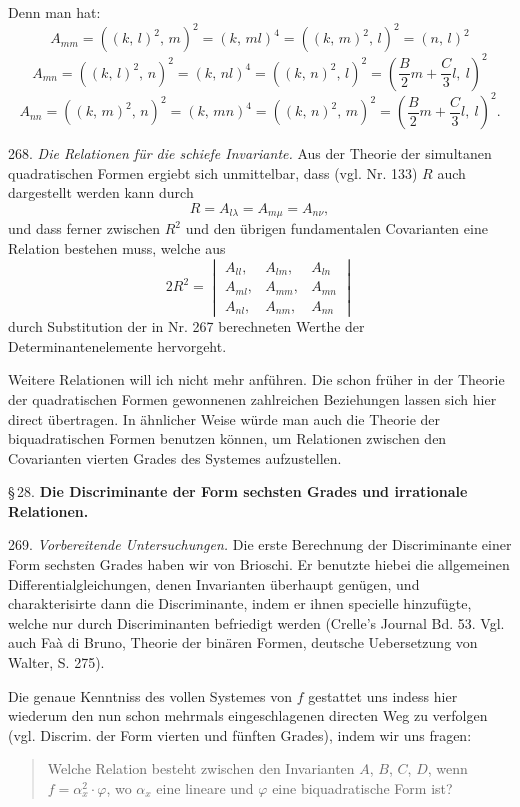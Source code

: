 \documentclass[11pt]{article}
\providecommand{\weberpage}[1]{}
\begin{document}
Denn man hat:
\[
A_{mm}=((k,\,l)^2,\,m)^2=(k,\,ml)^4=((k,\,m)^2,\,l)^2=(n,\,l)^2
\]
\[
A_{mn}=((k,\,l)^2,\,n)^2=(k,\,nl)^4=((k,\,n)^2,\,l)^2=\left(\frac{B}{2}m+\frac{C}{3}l,\ l\right)^2
\]
\[
A_{nn}=((k,\,m)^2,\,n)^2=(k,\,mn)^4=((k,\,n)^2,\,m)^2=\left(\frac{B}{2}m+\frac{C}{3}l,\ l\right)^2.
\]


\weberpage{291}

268. \textit{Die Relationen für die schiefe Invariante.} Aus der Theorie der simultanen quadratischen Formen ergiebt sich unmittelbar, dass (vgl. Nr. 133) $R$ auch dargestellt werden kann durch
\[
R=A_{l\lambda}=A_{m\mu}=A_{n\nu},
\]
und dass ferner zwischen $R^2$ und den übrigen fundamentalen Covarianten eine Relation bestehen muss, welche aus
\[
2R^2=\begin{vmatrix} A_{ll}, & A_{lm}, & A_{ln} \\ A_{ml}, & A_{mm}, & A_{mn} \\ A_{nl}, & A_{nm}, & A_{nn} \end{vmatrix}
\]
durch Substitution der in Nr. 267 berechneten Werthe der Determinantenelemente hervorgeht.

Weitere Relationen will ich nicht mehr anführen. Die schon früher in der Theorie der quadratischen Formen gewonnenen zahlreichen Beziehungen lassen sich hier direct übertragen. In ähnlicher Weise würde man auch die Theorie der biquadratischen Formen benutzen können, um Relationen zwischen den Covarianten vierten Grades des Systemes aufzustellen.

\S\,28. \textbf{Die Discriminante der Form sechsten Grades und irrationale Relationen.}

269. \textit{Vorbereitende Untersuchungen.} Die erste Berechnung der Discriminante einer Form sechsten Grades haben wir von Brioschi. Er benutzte hiebei die allgemeinen Differentialgleichungen, denen Invarianten überhaupt genügen, und charakterisirte dann die Discriminante, indem er ihnen specielle hinzufügte, welche nur durch Discriminanten befriedigt werden (Crelle's Journal Bd. 53. Vgl. auch Faà di Bruno, \glqq Theorie der binären Formen\grqq{}, deutsche Uebersetzung von Walter, S. 275).

Die genaue Kenntniss des vollen Systemes von $f$ gestattet uns indess hier wiederum den nun schon mehrmals eingeschlagenen directen Weg zu verfolgen (vgl. Discrim. der Form vierten und fünften Grades), indem wir uns fragen:

\begin{quote}
\glqq Welche Relation besteht zwischen den Invarianten $A$, $B$, $C$, $D$, wenn $f=\alpha_x^2\cdot\varphi$, wo $\alpha_x$ eine lineare und $\varphi$ eine biquadratische Form ist?\grqq{}
\end{quote}
\end{document}
